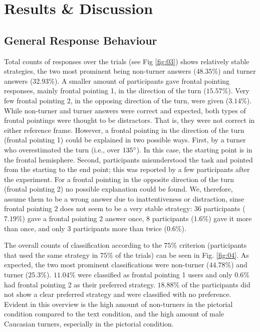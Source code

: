 \documentclass{frontiersSCNS} %
\begin{document}



\section{Results \& Discussion}

\subsection{General Response Behaviour}


Total counts of responses over the trials (see Fig \ref{fig:03}) shows relatively stable strategies, the two most prominent being non-turner answers ($48.35\%$) and turner answers ($32.93\%$). A smaller amount of participants gave frontal pointing responses, mainly frontal pointing 1, in the direction of the turn ($15.57\%$). Very few frontal pointing 2, in the opposing direction of the turn, were given ($3.14\%$). 
While non-turner and turner answers were correct and expected, both types of frontal pointings were thought to be distractors. That is, they were not correct in either reference frame. However, a frontal pointing in the direction of the turn (frontal pointing 1) could be explained in two possible ways. First, by a turner who overestimated the turn (i.e., over $135\degree$). In this case, the starting point is in the frontal hemisphere. Second, participants misunderstood the task and pointed from the starting to the end point; this was reported by a few participants after the experiment. 
For a frontal pointing in the opposite direction of the turn (frontal pointing 2) no possible explanation could be found. We, therefore, assume them to be a wrong answer due to inattentiveness or distraction, sinse frontal pointing 2 does not seem to be a very stable strategy: 36 participants ($7.19\%$) gave a frontal pointing 2 answer once, 8 participants ($1.6\%$) gave it more than once, and only 3 participants more than twice ($0.6\%$).

The overall counts of classification according to the $75\%$ criterion (participants that used the same strategy in $75\%$ of the trials) can be seen in Fig. \ref{fig:04}. As expected, the two most prominent classifications were non-turner ($44.78\%$) and turner ($25.3\%$). $11.04\%$ were classified as frontal pointing 1 users and only $0.6\%$ had frontal pointing 2 as their preferred strategy. $18.88\%$ of the participants did not show a clear preferred strategy and were classified with no preference.
Evident in this overview is the high amount of non-turners in the pictorial condition compared to the text condition, and the high amount of male Caucasian turners, especially in the pictorial condition.
\end{document}
